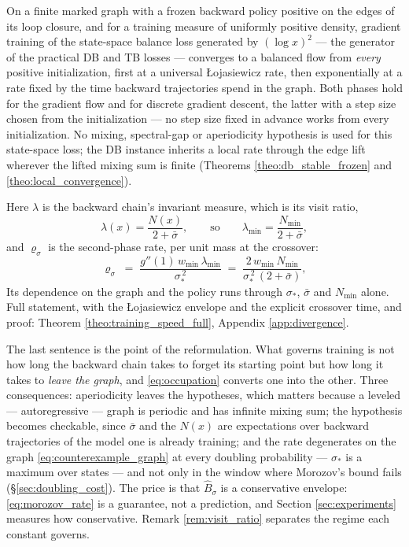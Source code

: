 \begin{theorem}\label{theo:training_speed}
On a finite marked graph with a frozen backward policy positive on the edges of its loop
closure, and for a training measure of uniformly positive density, gradient training of the
state-space balance loss generated by $(\log x)^2$ --- the generator of the practical DB and
TB losses --- converges to a balanced flow from
\emph{every} positive initialization, first at a universal \L ojasiewicz rate, then
exponentially at a rate fixed by the time backward trajectories spend in the graph. Both
phases hold for the gradient flow and for discrete gradient descent, the latter with a step
size chosen from the initialization --- no step size fixed in advance works from every
initialization. No mixing, spectral-gap or
aperiodicity hypothesis is used for this state-space loss; the DB instance inherits a local
rate through the edge lift wherever the lifted mixing sum is finite (Theorems
\ref{theo:db_stable_frozen} and \ref{theo:local_convergence}).
\end{theorem}
Here $\lambda$ is the backward chain's invariant measure, which is its visit ratio,
\begin{equation}\label{eq:occupation}
    \lambda(x)=\frac{N(x)}{2+\bar\sigma},\qquad\text{so}\qquad \lambda_{\min}=\frac{N_{\min}}{2+\bar\sigma},
\end{equation}
and $\varrho_\sigma$ is the second-phase rate, per unit mass at the crossover:
\begin{equation}\label{eq:morozov_rate}
    \varrho_\sigma\;=\;\frac{g''(1)\,w_{\min}\,\lambda_{\min}}{\sigma_*^{\,2}}\;=\;\frac{2\,w_{\min}\,N_{\min}}{\sigma_*^{\,2}\,(2+\bar\sigma)} ,
\end{equation}
Its dependence on the graph and the policy runs through $\sigma_*$, $\bar\sigma$ and
$N_{\min}$ alone. Full statement, with the
\L ojasiewicz envelope and the explicit crossover time, and proof: Theorem
\ref{theo:training_speed_full}, Appendix \ref{app:divergence}.

The last sentence is the point of the reformulation. What governs training is not how long
the backward chain takes to forget its starting point but how long it takes to \emph{leave the
graph}, and \eqref{eq:occupation} converts one into the other. Three consequences: aperiodicity
leaves the hypotheses, which matters because a leveled --- autoregressive --- graph is periodic
and has infinite mixing sum; the hypothesis becomes checkable, since $\bar\sigma$ and the
$N(x)$ are expectations over backward trajectories of the model one is already training; and
the rate degenerates on the graph
\eqref{eq:counterexample_graph} at every doubling probability --- $\sigma_*$ is a maximum over
states --- and not only in the window where Morozov's bound fails (\S\ref{sec:doubling_cost}). The price is that
$\widehat B_\sigma$ is a conservative envelope: \eqref{eq:morozov_rate} is a guarantee, not a
prediction, and Section \ref{sec:experiments} measures how conservative. Remark
\ref{rem:visit_ratio} separates the regime each constant governs.

